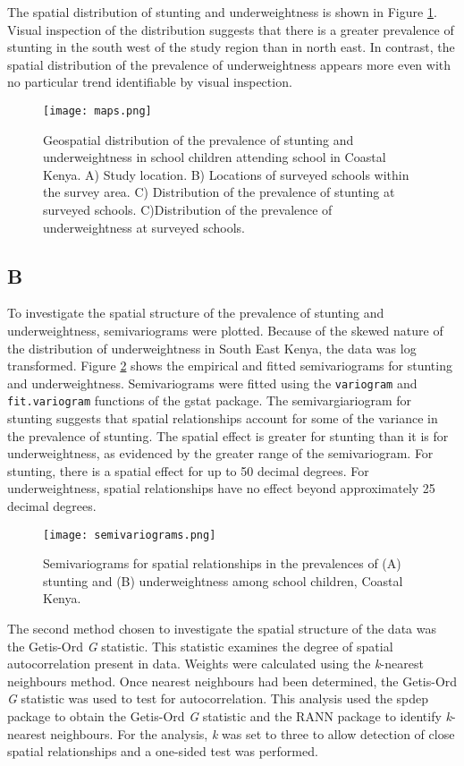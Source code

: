 \documentclass[11pt,a4paper,twoside]{article}\usepackage[]{graphicx}\usepackage[]{color}
\begin{document}
The spatial distribution of stunting and underweightness is shown in Figure \ref{dist_maps}. 
Visual inspection of the distribution suggests that there is a greater prevalence of stunting in the south west of the study region than in north east. 
In contrast, the spatial distribution of the prevalence of underweightness appears more even with no particular trend identifiable by visual inspection. 
\begin{figure}[b]
\texttt{[image: maps.png]}
\caption{Geospatial distribution of the prevalence of stunting and underweightness in school children attending school in Coastal Kenya. A) Study location. B) Locations of surveyed schools within the survey area. C) Distribution of the prevalence of stunting at surveyed schools. C)Distribution of the prevalence of underweightness at surveyed schools.}
\label{dist_maps}
\end{figure}

\subsection*{B}
To investigate the spatial structure of the prevalence of stunting and underweightness, semivariograms were plotted. 
Because of the skewed nature of the distribution of underweightness in South East Kenya, the data was log transformed. 
Figure \ref{semi} shows the empirical and fitted semivariograms for stunting and underweightness. 
Semivariograms were fitted using the \texttt{variogram} and \texttt{fit.variogram} functions of the gstat package. 
The semivargiariogram for stunting suggests that spatial relationships account for some of the variance in the prevalence of stunting. 
The spatial effect is greater for stunting than it is for underweightness, as evidenced by the greater range of the semivariogram. 
For stunting, there is a spatial effect for up to 50 decimal degrees. 
For underweightness, spatial relationships have no effect beyond approximately 25 decimal degrees. 
\begin{figure}[b]
\texttt{[image: semivariograms.png]}
\caption{Semivariograms for spatial relationships in the prevalences of (A) stunting  and (B) underweightness among school children, Coastal Kenya.}
\label{semi}
\end{figure}

The second method chosen to investigate the spatial structure of the data was the Getis-Ord  \textit{G} statistic. 
This statistic examines the degree of spatial autocorrelation present in data. 
Weights were calculated using the \textit{k}-nearest neighbours method.
Once nearest neighbours had been determined, the Getis-Ord \textit{G} statistic was used to test for autocorrelation. 
This analysis used the spdep package to obtain the Getis-Ord \textit{G} statistic and the RANN package to identify \textit{k}-nearest neighbours. 
For the analysis, \textit{k} was set to three to allow detection of close spatial relationships and a one-sided test was performed.
\end{document}
